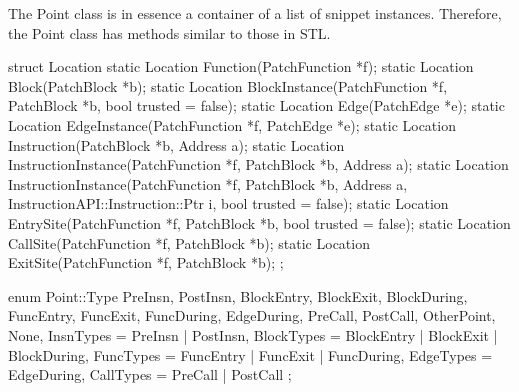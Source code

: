 The Point class is in essence a container of a list of snippet
instances. Therefore, the Point class has methods similar to those in STL.

\begin{apient}
struct Location {
   static Location Function(PatchFunction *f);
   static Location Block(PatchBlock *b);
   static Location BlockInstance(PatchFunction *f, PatchBlock *b, bool trusted = false);
   static Location Edge(PatchEdge *e);
   static Location EdgeInstance(PatchFunction *f, PatchEdge *e);
   static Location Instruction(PatchBlock *b, Address a);
   static Location InstructionInstance(PatchFunction *f, PatchBlock *b, Address a);
   static Location InstructionInstance(PatchFunction *f, PatchBlock *b, Address a,
                                       InstructionAPI::Instruction::Ptr i,
                                       bool trusted = false);
   static Location EntrySite(PatchFunction *f, PatchBlock *b, bool trusted = false);
   static Location CallSite(PatchFunction *f, PatchBlock *b);
   static Location ExitSite(PatchFunction *f, PatchBlock *b);
};
\end{apient}



\begin{apient}
enum Point::Type {
  PreInsn,
  PostInsn,
  BlockEntry,
  BlockExit,
  BlockDuring,
  FuncEntry,
  FuncExit,
  FuncDuring,
  EdgeDuring,
  PreCall,
  PostCall,
  OtherPoint,
  None,
  InsnTypes = PreInsn | PostInsn,
  BlockTypes = BlockEntry | BlockExit | BlockDuring,
  FuncTypes = FuncEntry | FuncExit | FuncDuring,
  EdgeTypes = EdgeDuring,
  CallTypes = PreCall | PostCall
};
\end{apient}

